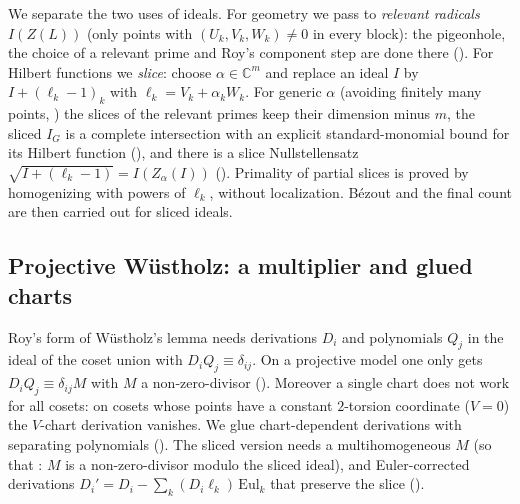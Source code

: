 \documentclass[11pt]{amsart}
\theoremstyle{definition}
\theoremstyle{remark}
\numberwithin{equation}{section}
\newcommand{\CC}{\mathbb{C}}
\begin{document}
We separate the two uses of ideals. For geometry we pass to \emph{relevant radicals}
$I(Z(L))$ (only points with $(U_k,V_k,W_k)\ne0$ in every block): the pigeonhole, the choice of a
relevant prime and Roy's component step are done there (). For Hilbert functions
we \emph{slice}: choose $\alpha\in\CC^m$ and replace an ideal $I$ by $I+(\ell_k-1)_k$ with
$\ell_k=V_k+\alpha_kW_k$. For generic $\alpha$ (avoiding finitely many points, ) the
slices of the relevant primes keep their dimension minus $m$, the sliced $I_G$ is a complete
intersection with an explicit standard-monomial bound for its Hilbert function (),
and there is a slice Nullstellensatz $\sqrt{I+(\ell_k-1)}=I(Z_\alpha(I))$ (). Primality of
partial slices is proved by homogenizing with powers of $\ell_k$, without localization. Bézout and the
final count are then carried out for sliced ideals.

\subsection{Projective Wüstholz: a multiplier and glued charts}
Roy's form of Wüstholz's lemma \cite[Lemma~8.16, Thm.~8.18]{DALAG} needs derivations $D_i$ and
polynomials $Q_j$ in the ideal of the coset union with $D_iQ_j\equiv\delta_{ij}$. On a projective
model one only gets $D_iQ_j\equiv\delta_{ij}M$ with $M$ a non-zero-divisor (). Moreover a
single chart does not work for all cosets: on cosets whose points have a constant $2$-torsion
coordinate ($V=0$) the $V$-chart derivation vanishes. We glue chart-dependent derivations with
separating polynomials (). The sliced version needs a multihomogeneous $M$ (so that
: $M$ is a non-zero-divisor modulo the sliced ideal), and Euler-corrected derivations
$D_i'=D_i-\sum_k(D_i\ell_k)\,\mathrm{Eul}_k$ that preserve the slice ().
\end{document}
